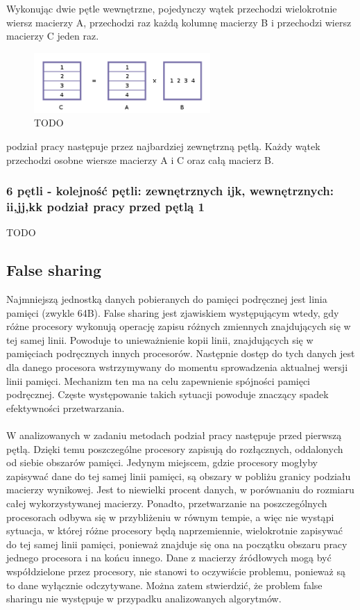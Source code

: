 \documentclass[12pt,a4paper]{article}
\begin{document}
Wykonując dwie pętle wewnętrzne, pojedynczy wątek przechodzi wielokrotnie wiersz macierzy A, przechodzi raz każdą kolumnę macierzy B i przechodzi wiersz macierzy C jeden raz.

\begin{figure}[H]
  \centering
    \includegraphics[width=0.60\textwidth]{IJK_KJI.jpg}
    \caption{TODO}
\end{figure}

podział pracy następuje przez najbardziej zewnętrzną pętlą. Każdy wątek przechodzi osobne wiersze macierzy A i C oraz całą macierz B.

\subsubsection{6 pętli - kolejność pętli: zewnętrznych ijk, wewnętrznych: ii,jj,kk podział pracy przed pętlą 1}
TODO


\subsection{False sharing}

Najmniejszą jednostką danych pobieranych do pamięci podręcznej jest linia pamięci (zwykle 64B). False sharing jest zjawiskiem występującym wtedy, gdy różne procesory wykonują operację zapisu różnych zmiennych znajdujących się w tej samej linii. Powoduje to unieważnienie kopii linii, znajdujących się w pamięciach podręcznych innych procesorów. Następnie dostęp do tych danych jest dla danego procesora wstrzymywany do momentu sprowadzenia aktualnej wersji linii pamięci. Mechanizm ten ma na celu zapewnienie spójności pamięci podręcznej. Częste występowanie takich sytuacji powoduje znaczący spadek efektywności przetwarzania.\\
\\
W analizowanych w zadaniu metodach podział pracy następuje przed pierwszą pętlą. Dzięki temu poszczególne procesory zapisują do rozłącznych, oddalonych od siebie obszarów pamięci. Jedynym miejscem, gdzie procesory mogłyby zapisywać dane do tej samej linii pamięci, są obszary w pobliżu granicy podziału macierzy wynikowej. Jest to niewielki procent danych, w porównaniu do rozmiaru całej wykorzystywanej macierzy. Ponadto, przetwarzanie na poszczególnych procesorach odbywa się w przybliżeniu w równym tempie, a więc nie wystąpi sytuacja, w której różne procesory będą naprzemiennie, wielokrotnie zapisywać do tej samej linii pamięci, ponieważ znajduje się ona na początku obszaru pracy jednego procesora i na końcu innego. Dane z macierzy źródłowych mogą być współdzielone przez procesory, nie stanowi to oczywiście problemu, ponieważ są to dane wyłącznie odczytywane. Można zatem stwierdzić, że problem false sharingu nie występuje w przypadku analizowanych algorytmów.
\end{document}
